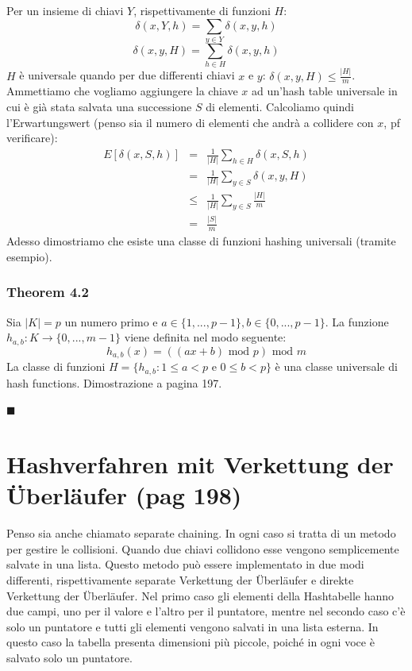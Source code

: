 \documentclass[a4paper]{book}
\newenvironment{mytheorem}[1]{\subsubsection*{Theorem #1}}{\begin{flushright}$\blacksquare$\end{flushright}}
\begin{document}
Per un insieme di chiavi $Y$, rispettivamente di funzioni $H$:
$$\delta (x,Y,h)= \sum_{y \in Y} \delta (x,y,h)$$
$$\delta (x,y,H)= \sum_{h \in H} \delta (x,y,h)$$
$H$ è universale quando per due differenti chiavi $x$ e $y$: $\delta (x,y,H) \leq \frac{|H|}{m}$.
Ammettiamo che vogliamo aggiungere la chiave $x$ ad un'hash table universale in cui è già stata salvata una successione $S$ di elementi. Calcoliamo quindi l'Erwartungswert (penso sia il numero di elementi che andrà a collidere con $x$, pf verificare):
\begin{eqnarray}
E[\delta (x,S,h)] &=& \frac{1}{|H|} \sum_{h \in H} \delta (x,S,h) \nonumber \\
&=& \frac{1}{|H|} \sum_{y \in S} \delta (x,y,H) \nonumber \\
&\leq & \frac{1}{|H|} \sum_{y \in S} \frac{|H|}{m} \nonumber \\
&=& \frac{|S|}{m}
\end{eqnarray}
Adesso dimostriamo che esiste una classe di funzioni hashing universali (tramite esempio).
\begin{mytheorem}{4.2}
Sia $|K|=p$ un numero primo e $a \in \{1, ..., p-1\},b \in \{0, ..., p-1\}$. La funzione $h_{a,b}: K \rightarrow \{0, ..., m-1\}$ viene definita nel modo seguente:
$$ h_{a,b}(x)=((ax+b) \mbox{ mod } p) \mbox{ mod } m$$
La classe di funzioni $H=\{h_{a,b} : 1\leq a < p \mbox{ e } 0\leq b <p\}$ è una classe universale di hash functions. Dimostrazione a pagina 197.
\end{mytheorem}
\section{Hashverfahren mit Verkettung der Überläufer (pag 198)}
Penso sia anche chiamato separate chaining. In ogni caso si tratta di un metodo per gestire le collisioni. Quando due chiavi collidono esse vengono semplicemente salvate in una lista. Questo metodo può essere implementato in due modi differenti, rispettivamente separate Verkettung der Überläufer e direkte Verkettung der Überläufer. Nel primo caso gli elementi della Hashtabelle hanno due campi, uno per il valore e l'altro per il puntatore, mentre nel secondo caso c'è solo un puntatore e tutti gli elementi vengono salvati in una lista esterna. In questo caso la tabella presenta dimensioni più piccole, poiché in ogni voce è salvato solo un puntatore.
\end{document}
